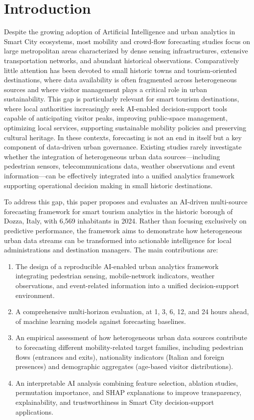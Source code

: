 \section{Introduction}
\label{sec:introduction}

Despite the growing adoption of Artificial Intelligence and urban analytics in Smart City ecosystems, most mobility and crowd-flow forecasting studies focus on large metropolitan areas characterized by dense sensing infrastructures, extensive transportation networks, and abundant historical observations. Comparatively little attention has been devoted to small historic towns and tourism-oriented destinations, where data availability is often fragmented across heterogeneous sources and where visitor management plays a critical role in urban sustainability.
This gap is particularly relevant for smart tourism destinations, where local authorities increasingly seek AI-enabled decision-support tools capable of anticipating visitor peaks, improving public-space management, optimizing local services, supporting sustainable mobility policies and preserving cultural heritage. In these contexts, forecasting is not an end in itself but a key component of data-driven urban governance. Existing studies rarely investigate whether the integration of heterogeneous urban data sources—including pedestrian sensors, telecommunications data, weather observations and event information—can be effectively integrated into a unified analytics framework supporting operational decision making in small historic destinations.

To address this gap, this paper proposes and evaluates an AI-driven multi-source forecasting framework for smart tourism analytics in the historic borough of Dozza, Italy, with 6,569 inhabitants in 2024. Rather than focusing exclusively on predictive performance, the framework aims to demonstrate how heterogeneous urban data streams can be transformed into actionable intelligence for local administrations and destination managers. The main contributions are:
\begin{enumerate}
    \item The design of a reproducible AI-enabled urban analytics framework integrating pedestrian sensing, mobile-network indicators, weather observations, and event-related information into a unified decision-support environment.
    \item A comprehensive multi-horizon evaluation, at 1, 3, 6, 12, and 24 hours ahead, of machine learning models against forecasting baselines.
    \item An empirical assessment of how heterogeneous urban data sources contribute to forecasting different mobility-related target families, including pedestrian flows (entrances and exits), nationality indicators (Italian and foreign presences) and demographic aggregates (age-based visitor distributions).
    \item An interpretable AI analysis combining feature selection, ablation studies, permutation importance, and SHAP explanations to improve transparency, explainability, and trustworthiness in Smart City decision-support applications.
\end{enumerate}
 
